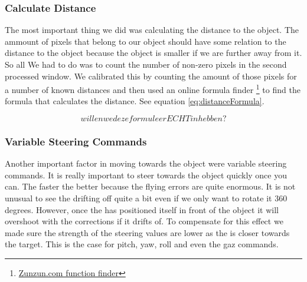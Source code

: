 \subsubsection{Calculate Distance}
The most important thing we did was calculating the distance to the object. The ammount of pixels that belong to our 
object should have some relation to the distance to the object because the object is smaller if we are further away
from it. So all We had to do was to count the number of non-zero pixels in the second processed
window. 
We calibrated this by counting the amount of those pixels for a number of known distances and
then used an online formula finder \footnote{\href{http://zunzun.com/FunctionFinder/2/}{Zunzun.com function finder}} to find the formula 
that calculates the distance. See equation \ref{eq:distanceFormula}.

\begin{equation}
willen we deze formule er ECHT in hebben?
\label{eq:distanceFormula}
\end{equation}

\subsubsection{Variable Steering Commands}
Another important factor in moving towards the object were variable steering commands. 
It is really important to steer towards the object quickly once you can. The faster the 
better because the flying errors are quite enormous. It is not unusual to see the \Ardrone
drifting off quite a bit even if we only want to rotate it 360 degrees. However, once
the \Ardrone has positioned itself in front of the object it will overshoot with the
corrections if it drifts of. To compensate for this effect we made sure the strength
of the steering values are lower as the \Ardrone is closer towards the target. This
is the case for pitch, yaw, roll and even the gaz commands. 

